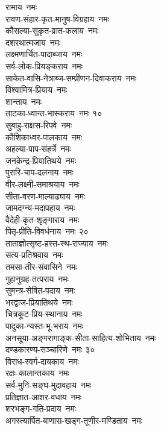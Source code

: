 \begin{multicols}{2}
\begin{flushleft}
रामाय~नमः\\
रावण-संहार-कृत-मानुष-विग्रहाय~नमः\\
कौसल्या-सुकृत-व्रात-फलाय~नमः\\
दशरथात्मजाय~नमः\\
लक्ष्मणार्चित-पादाब्जाय~नमः\\
सर्व-लोक-प्रियङ्कराय~नमः\\
साकेत-वासि-नेत्राब्ज-सम्प्रीणन-दिवाकराय~नमः \\
विश्वामित्र-प्रियाय~नमः\\
शान्ताय~नमः\\
ताटका-ध्वान्त-भास्कराय~नमः \hfill १०\\
सुबाहु-राक्षस-रिपवे~नमः\\
कौशिकाध्वर-पालकाय~नमः \\
अहल्या-पाप-संहर्त्रे~नमः\\
जनकेन्द्र-प्रियातिथये~नमः\\
पुरारि-चाप-दलनाय~नमः\\
वीर-लक्ष्मी-समाश्रयाय~नमः\\
सीता-वरण-माल्याढ्याय~नमः\\
जामदग्न्य-मदापहाय~नमः\\
वैदेही-कृत-शृङ्गाराय~नमः \\
पितृ-प्रीति-विवर्धनाय~नमः \hfill २०\\
ताताज्ञोत्सृष्ट-हस्त-स्थ-राज्याय~नमः\\
सत्य-प्रतिश्रवाय~नमः\\
तमसा-तीर-संवासिने~नमः\\
गुहानुग्रह-तत्पराय~नमः\\
सुमन्त्र-सेवित-पदाय~नमः\\
भरद्वाज-प्रियातिथये~नमः\\
चित्रकूट-प्रिय-स्थानाय~नमः\\
पादुका-न्यस्त-भू-भराय~नमः\\
अनसूया-अङ्गरागाङ्क-सीता-साहित्य-शोभिताय~नमः\\
दण्डकारण्य-सञ्चारिणे~नमः \hfill ३०\\
विराध-स्वर्ग-दायकाय~नमः\\
रक्षः-कालान्तकाय~नमः\\
सर्व-मुनि-सङ्घ-मुदावहाय~नमः\\
प्रतिज्ञात-आशर-वधाय~नमः\\
शरभङ्ग-गति-प्रदाय~नमः\\
अगस्त्यार्पित-बाणास-खड्ग-तूणीर-मण्डिताय~नमः\\

\end{flushleft}
\end{multicols}
